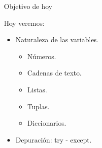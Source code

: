 \begin{frame}[t]{Objetivo de hoy}\vspace{10pt}

Hoy veremos:

\begin{itemize}
	\item Naturaleza de las variables.
	\begin{itemize}
		\item Números.
		\item Cadenas de texto.
		\item Listas.
		\item Tuplas.
		\item Diccionarios.
	\end{itemize}
	\item Depuración: try - except.
\end{itemize}

\end{frame}